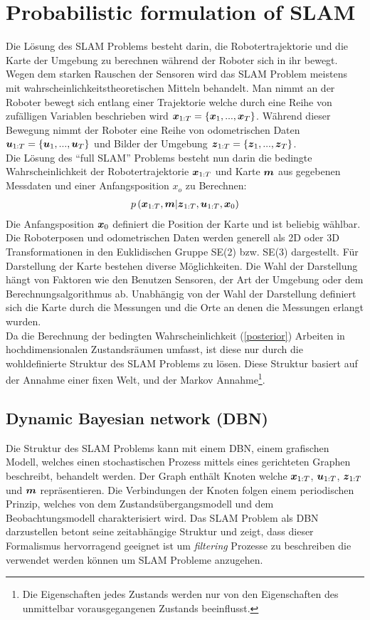 \documentclass[12pt]{article}
\renewcommand*\vec[1]{{\mbox{\boldmath\ensuremath{#1}}}}
\begin{document}
\section{Probabilistic formulation of SLAM}
Die Lösung des SLAM Problems besteht darin, die Robotertrajektorie und die Karte der Umgebung zu berechnen während der Roboter sich in ihr bewegt.
Wegen dem starken Rauschen der Sensoren wird das SLAM Problem meistens mit wahrscheinlichkeitstheoretischen Mitteln behandelt. Man nimmt an der
Roboter bewegt sich entlang einer Trajektorie welche durch eine Reihe von zufälligen Variablen beschrieben wird
$\vec x_{1:T} = \left\{\vec x_1,...,\vec x_T\right\}$. Während dieser Bewegung nimmt der Roboter eine Reihe von odometrischen Daten
$\vec u_{1:T} = \left\{\vec u_1,...,\vec u_T\right\}$ und Bilder der Umgebung $\vec z_{1:T} = \left\{\vec z_1,...,\vec z_T\right\}$.
\\
Die Lösung des ``full SLAM'' Problems besteht nun darin die bedingte Wahrscheinlichkeit der Robotertrajektorie $\vec x_{1:T}$ und Karte $\vec m$ aus
gegebenen Messdaten und einer Anfangsposition $x_o$ zu Berechnen:
\begin{align}
 \label{posterior}
 p\left(\vec x_{1:T},\vec m|\vec z_{1:T}, \vec u_{1:T}, \vec x_0\right)
\end{align}
Die Anfangsposition $\vec x_0$ definiert die Position der Karte und ist beliebig wählbar. Die Roboterposen und odometrischen Daten werden 
generell als 2D oder 3D Transformationen in den Euklidischen Gruppe SE(2) bzw. SE(3) dargestellt. Für Darstellung der Karte bestehen diverse
Möglichkeiten. Die Wahl der Darstellung hängt von Faktoren wie den Benutzen Sensoren, der Art der Umgebung oder dem Berechnungsalgorithmus ab.
Unabhängig von der Wahl der Darstellung definiert sich die Karte durch die Messungen und die Orte an denen die Messungen erlangt wurden.
\\
Da die Berechnung der bedingten Wahrscheinlichkeit (\ref{posterior}) Arbeiten in hochdimensionalen Zustandsräumen umfasst, ist diese nur durch
die wohldefinierte Struktur des SLAM Problems zu lösen. Diese Struktur basiert auf der Annahme einer fixen Welt, und der Markov
Annahme\footnote{Die Eigenschaften jedes Zustands werden nur von den Eigenschaften des unmittelbar vorausgegangenen Zustands beeinflusst.}.

\subsection{Dynamic Bayesian network (DBN)}
Die Struktur des SLAM Problems kann mit einem DBN, einem grafischen Modell, welches einen stochastischen Prozess mittels eines gerichteten Graphen
beschreibt, behandelt werden. Der Graph enthält Knoten welche $\vec x_{1:T}$, $\vec u_{1:T}$, $\vec z_{1:T}$ und $\vec m$ repräsentieren. Die
Verbindungen der Knoten folgen einem periodischen Prinzip, welches von dem Zustandsübergangsmodell und dem Beobachtungsmodell charakterisiert wird.
Das SLAM Problem als DBN darzustellen betont seine zeitabhängige Struktur und zeigt, dass dieser Formalismus hervorragend geeignet ist um 
\textit{filtering} Prozesse zu beschreiben die verwendet werden können um SLAM Probleme anzugehen.
\end{document}
